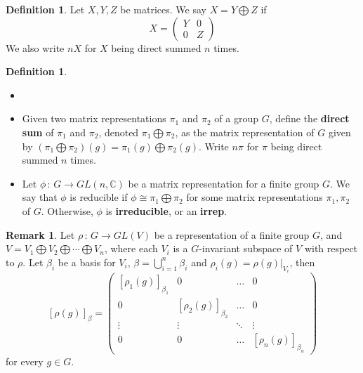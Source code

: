 \documentclass{book}
\newcommand{\C}{\mathbb{C}}
\newcommand{\define}[1]{\textbf{#1}}
\theoremstyle{definition}
\newtheorem{definition}[lemma]{Definition}
\theoremstyle{remarkstyle}
\newtheorem*{remark}{Remark}%
\begin{document}
\begin{definition}
    Let $X,Y,Z$ be matrices. We say $X=Y\bigoplus Z$ if 
    $$
    X = \left(
    \begin{array}{cc}
        Y & 0 \\
        0 & Z 
    \end{array}
    \right)
    $$
    We also write $nX$ for $X$ being direct summed $n$ times. \newline
\end{definition}

\begin{definition}
\begin{itemize}
    \item[]
    \item Given two matrix representations $\pi_1$ and $\pi_2$ of a group $G$, define the \define{direct sum} of $\pi_1$ and $\pi_2$, denoted $\pi_1\bigoplus\pi_2$, as the matrix representation of $G$ given by $(\pi_1\bigoplus\pi_2)(g)=\pi_1(g)\bigoplus\pi_2(g)  $. Write $n\pi$ for $\pi$ being direct summed $n$ times. 
    \item Let $\phi\,:\, G\rightarrow GL(n,\C) $ be a matrix representation for a finite group $G$. We say that $\phi$ is reducible if $\phi\cong\pi_1\bigoplus\pi_2$ for some matrix representations $\pi_1,\pi_2$ of $G$. Otherwise, $\phi$ is \define{irreducible}, or an \define{irrep}.
\end{itemize}
\end{definition}
\begin{remark}
    Let $\rho\,:\,G\rightarrow GL(V)$ be a representation of a finite group $G$, and $V=V_1\bigoplus V_2\bigoplus\cdots\bigoplus V_n$, where each $V_i$ is a $G$-invariant subspace of $V$ with respect to $\rho$. Let $\beta_i$ be a basis for $V_i$, $\beta=\bigcup^n_{i=1}\beta_i $ and $\rho_i(g)=\rho(g)\rvert_{V_i}$, then 
    $$
    [\rho(g)]_\beta = \left(
    \begin{array}{cccc}
        [\rho_1(g)]_{\beta_1} & 0 & \dots & 0 \\
        0 & [\rho_2(g)]_{\beta_2} & \dots & 0 \\
        \vdots & \vdots & \ddots & \vdots \\
        0 & 0 & \dots & [\rho_n(g)]_{\beta_n}
    \end{array}
    \right)
    $$
    for every $g\in G$. \newline
\end{remark}
\end{document}
